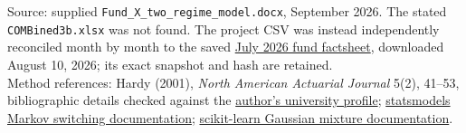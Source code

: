 \documentclass[11pt]{article}
\begin{document}
{\footnotesize
Source: supplied \texttt{Fund\_X\_two\_regime\_model.docx}, September 2026.
The stated \texttt{COMBined3b.xlsx} was not found. The project CSV
was instead independently reconciled month by month to the saved
\href{https://spartanfunds.ca/wp-content/uploads/2021/11/LSQ-Oct21.pdf}{July 2026 fund factsheet},
downloaded August 10, 2026; its exact snapshot and hash are retained.\\
Method references: Hardy (2001), \emph{North American Actuarial Journal} 5(2),
41--53, bibliographic details checked against the
\href{https://uwaterloo.ca/statistics-and-actuarial-science/profiles/mary-hardy}{author's university profile};
\href{https://www.statsmodels.org/stable/examples/notebooks/generated/markov_regression.html}{statsmodels Markov switching documentation};
\href{https://scikit-learn.org/1.0/modules/mixture.html}{scikit-learn Gaussian mixture documentation}.
}
\end{document}
